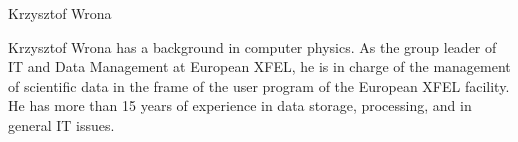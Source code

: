 \begin{participant}[type=PI,PM=1,gender=male]{Krzysztof Wrona}








  \medskip Krzysztof Wrona has a background in computer physics. As
  the group leader of IT and Data Management at European XFEL, he is
  in charge of the management of scientific data in the frame of the
  user program of the European XFEL facility. He has more than 15
  years of experience in data storage, processing, and in general IT
  issues.
\end{participant}

